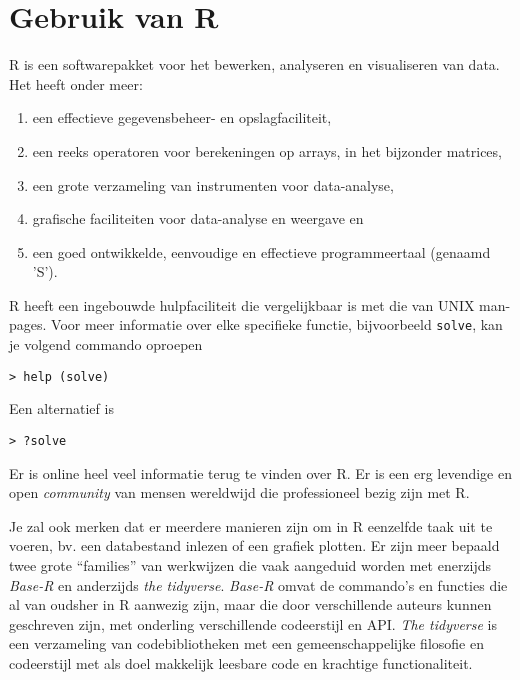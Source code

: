 \section{Gebruik van R}

R is een softwarepakket voor het bewerken, analyseren en visualiseren van data. Het heeft onder meer:

\begin{enumerate}
  \item een effectieve gegevensbeheer- en opslagfaciliteit,
  \item een reeks operatoren voor berekeningen op arrays, in het bijzonder matrices,
  \item een grote verzameling van instrumenten voor data-analyse,
  \item grafische faciliteiten voor data-analyse en weergave en
  \item een goed ontwikkelde, eenvoudige en effectieve programmeertaal (genaamd 'S').
\end{enumerate}

R heeft een ingebouwde hulpfaciliteit die vergelijkbaar is met die van UNIX man-pages. Voor meer informatie over elke specifieke functie, bijvoorbeeld \texttt{solve}, kan je volgend commando oproepen

\begin{lstlisting}
> help (solve)
\end{lstlisting}

Een alternatief is
\begin{lstlisting}
> ?solve
\end{lstlisting}

Er is online heel veel informatie terug te vinden over R. Er is een erg levendige en open \textit{community} van mensen wereldwijd die professioneel bezig zijn met R.

Je zal ook merken dat er meerdere manieren zijn om in R eenzelfde taak uit te voeren, bv. een databestand inlezen of een grafiek plotten. Er zijn meer bepaald twee grote ``families'' van werkwijzen die vaak aangeduid worden met enerzijds \textit{Base-R} en anderzijds \textit{the tidyverse}. \textit{Base-R} omvat de commando's en functies die al van oudsher in R aanwezig zijn, maar die door verschillende auteurs kunnen geschreven zijn, met onderling verschillende codeerstijl en API. \textit{The tidyverse} is een verzameling van codebibliotheken met een gemeenschappelijke filosofie en codeerstijl met als doel makkelijk leesbare code en krachtige functionaliteit.

